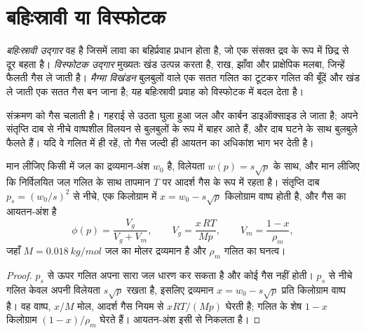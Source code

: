 \section{बहिःस्रावी या विस्फोटक}

\begin{definition}[बहिःस्रावी और विस्फोटक उद्गार, विखंडन]\label{def:b2:eruptive-styles:regimes}
\emph{बहिःस्रावी उद्गार} वह है जिसमें
लावा का बहिर्प्रवाह प्रधान होता है, जो एक संसक्त द्रव के रूप में छिद्र से दूर बहता है।
\emph{विस्फोटक उद्गार} मुख्यतः खंड उत्पन्न करता है,
राख, झाँवा और प्राक्षेपिक मलबा, जिन्हें फैलती गैस ले जाती है। \emph{मैग्मा
विखंडन} बुलबुलों वाले एक सतत गलित का टूटकर
गलित की बूँदें और खंड ले जाती एक सतत गैस बन जाना है;
यह बहिःस्रावी प्रवाह को विस्फोटक में बदल देता है।
\end{definition}

संक्रमण को गैस चलाती है। गहराई से उठता  घुला हुआ जल और
कार्बन डाइऑक्साइड ले जाता है; अपने संतृप्ति दाब से नीचे वाष्पशील
विलयन से बुलबुलों के रूप में बाहर आते हैं, और दाब घटने के साथ बुलबुले फैलते हैं।
यदि वे गलित में ही रहें, तो गैस जल्दी ही आयतन का अधिकांश भाग भर देती है।

\begin{proposition}[बंद-तंत्र विगैसन में गैस का आयतन-अंश]\label{prop:b2:eruptive-styles:gas}
मान लीजिए किसी  में जल का द्रव्यमान-अंश $w_0$ है, विलेयता $w(p) =
s\sqrt p$ के साथ, और मान लीजिए कि निर्विलयित जल गलित के साथ तापमान $T$ पर
आदर्श गैस के रूप में रहता है। संतृप्ति दाब $p_s = (w_0/s)^2$ से नीचे, एक
किलोग्राम  में $x = w_0 - s\sqrt p$ किलोग्राम वाष्प होती है, और गैस का
आयतन-अंश है
\[
\phi(p) = \frac{V_g}{V_g + V_m}, \qquad V_g = \frac{x\,RT}{M p}, \qquad
V_m = \frac{1 - x}{\rho_m},
\]
जहाँ $M = \qty{0.018}{kg/mol}$ जल का मोलर द्रव्यमान है और $\rho_m$ गलित का
घनत्व।
\end{proposition}

\begin{proof}
$p_s$ से ऊपर गलित अपना सारा जल धारण कर सकता है और कोई गैस नहीं होती। $p_s$ से नीचे
गलित केवल अपनी विलेयता $s\sqrt p$ रखता है, इसलिए द्रव्यमान $x = w_0 - s\sqrt p$ प्रति
किलोग्राम  वाष्प है। वह वाष्प, $x/M$ मोल, आदर्श गैस नियम से $xRT/(Mp)$
घेरती है; गलित के शेष $1 - x$ किलोग्राम $(1 - x)/\rho_m$ घेरते हैं।
आयतन-अंश इसी से निकलता है।
\end{proof}

